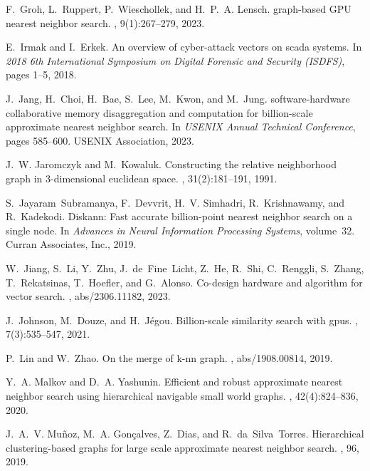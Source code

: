 \documentclass[11pt]{article}
\begin{document}
\begin{thebibliography}{10}
\begin{small}
F.~Groh, L.~Ruppert, P.~Wieschollek, and H.~P.~A. Lensch.
 graph-based {GPU} nearest neighbor search.
, 9(1):267--279, 2023.

E.~Irmak and I.~Erkek.
\newblock An overview of cyber-attack vectors on scada systems.
\newblock In {\em 2018 6th International Symposium on Digital Forensic and
	Security (ISDFS)}, pages 1--5, 2018.

J.~Jang, H.~Choi, H.~Bae, S.~Lee, M.~Kwon, and M.~Jung.
 software-hardware collaborative memory disaggregation and
computation for billion-scale approximate nearest neighbor search.
\newblock In {\em {USENIX} Annual Technical Conference}, pages 585--600.
{USENIX} Association, 2023.

J.~W. Jaromczyk and M.~Kowaluk.
\newblock Constructing the relative neighborhood graph in 3-dimensional
euclidean space.
, 31(2):181--191, 1991.

S.~Jayaram~Subramanya, F.~Devvrit, H.~V. Simhadri, R.~Krishnawamy, and
R.~Kadekodi.
\newblock Diskann: Fast accurate billion-point nearest neighbor search on a
single node.
\newblock In {\em Advances in Neural Information Processing Systems},
volume~32. Curran Associates, Inc., 2019.

W.~Jiang, S.~Li, Y.~Zhu, J.~de~Fine~Licht, Z.~He, R.~Shi, C.~Renggli, S.~Zhang,
T.~Rekatsinas, T.~Hoefler, and G.~Alonso.
\newblock Co-design hardware and algorithm for vector search.
, abs/2306.11182, 2023.

J.~Johnson, M.~Douze, and H.~J{\'{e}}gou.
\newblock Billion-scale similarity search with gpus.
, 7(3):535--547, 2021.

P.~Lin and W.~Zhao.
\newblock On the merge of k-nn graph.
, abs/1908.00814, 2019.

Y.~A. Malkov and D.~A. Yashunin.
\newblock Efficient and robust approximate nearest neighbor search using
hierarchical navigable small world graphs.
, 42(4):824--836,
2020.

J.~A.~V. Mu{\~{n}}oz, M.~A. Gon{\c{c}}alves, Z.~Dias, and R.~da~Silva~Torres.
\newblock Hierarchical clustering-based graphs for large scale approximate
nearest neighbor search.
, 96, 2019.


\end{small}
\end{thebibliography}
\end{document}
